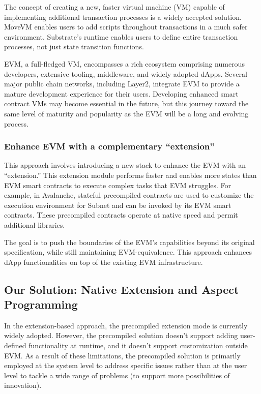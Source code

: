The concept of creating a new, faster virtual machine (VM) capable of implementing additional transaction processes is a widely accepted solution. MoveVM\cite{blackshear2019move} enables users to add scripts throughout transactions in a much safer environment. Substrate's runtime\cite{web3foundation2020} enables users to define entire transaction processes, not just state transition functions.

EVM, a full-fledged VM, encompasses a rich ecosystem comprising numerous developers, extensive tooling, middleware, and widely adopted dApps. Several major public chain networks, including Layer2, integrate EVM to provide a mature development experience for their users. Developing enhanced smart contract VMs may become essential in the future, but this journey toward the same level of maturity and popularity as the EVM will be a long and evolving process.

\subsubsection{Enhance EVM with a complementary “extension”}

This approach involves introducing a new stack to enhance the EVM with an “extension.” This extension module performs faster and enables more states than EVM smart contracts to execute complex tasks that EVM struggles. For example, in Avalanche\cite{avalanchewhitepaper}, stateful precompiled contracts are used to customize the execution environment for Subnet\cite{avalanchewhitepaper} and can be invoked by its EVM smart contracts. These precompiled contracts operate at native speed and permit additional libraries.

The goal is to push the boundaries of the EVM’s capabilities beyond its original specification, while still maintaining EVM-equivalence. This approach enhances dApp functionalities on top of the existing EVM infrastructure.

\subsection{Our Solution: Native Extension and Aspect Programming}

In the extension-based approach, the precompiled extension mode is currently widely adopted. However, the precompiled solution doesn’t support adding user-defined functionality at runtime, and it doesn't support customization outside EVM. As a result of these limitations, the precompiled solution is primarily employed at the system level to address specific issues rather than at the user level to tackle a wide range of problems (to support more possibilities of innovation).

